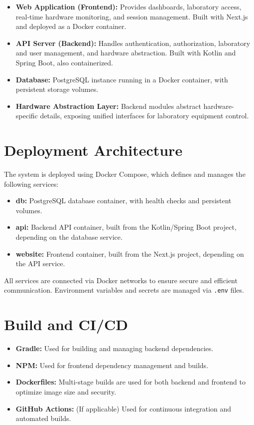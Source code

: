 \begin{itemize}
    \item \textbf{Web Application (Frontend):} Provides dashboards, laboratory access, real-time hardware monitoring, and session management. Built with Next.js and deployed as a Docker container.
    \item \textbf{API Server (Backend):} Handles authentication, authorization, laboratory and user management, and hardware abstraction. Built with Kotlin and Spring Boot, also containerized.
    \item \textbf{Database:} PostgreSQL instance running in a Docker container, with persistent storage volumes.
    \item \textbf{Hardware Abstraction Layer:} Backend modules abstract hardware-specific details, exposing unified interfaces for laboratory equipment control.
\end{itemize}

\section{Deployment Architecture}

The system is deployed using Docker Compose, which defines and manages the following services:

\begin{itemize}
    \item \textbf{db:} PostgreSQL database container, with health checks and persistent volumes.
    \item \textbf{api:} Backend API container, built from the Kotlin/Spring Boot project, depending on the database service.
    \item \textbf{website:} Frontend container, built from the Next.js project, depending on the API service.
\end{itemize}

All services are connected via Docker networks to ensure secure and efficient communication. Environment variables and secrets are managed via \texttt{.env} files.

\section{Build and CI/CD}

\begin{itemize}
    \item \textbf{Gradle:} Used for building and managing backend dependencies.
    \item \textbf{NPM:} Used for frontend dependency management and builds.
    \item \textbf{Dockerfiles:} Multi-stage builds are used for both backend and frontend to optimize image size and security.
    \item \textbf{GitHub Actions:} (If applicable) Used for continuous integration and automated builds.
\end{itemize}

